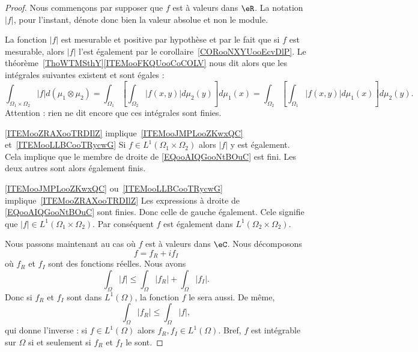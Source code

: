\begin{proof}

    Nous commençons par supposer que \( f\) est à valeurs dans \( \eR\). La notation \( | f |\), pour l'instant,  dénote donc bien la valeur absolue et non le module.

    La fonction \( | f |\) est mesurable et positive par hypothèse et par le fait que si \( f\) est mesurable, alors \( | f |\) l'est également par le corollaire~\ref{CORooNXYUooEcvDlP}. Le théorème~\ref{ThoWTMSthY}\ref{ITEMooFKQUooCoCOLV} nous dit alors que les intégrales suivantes existent et sont égales :
    \begin{equation}        \label{EQooAIQGooNtBOuC}
            \int_{\Omega_1\times \Omega_2}| f |d(\mu_1\otimes \mu_2)=\int_{\Omega_1}\left[ \int_{\Omega_2}|f(x,y)|d\mu_2(y) \right]d\mu_1(x)
            =\int_{\Omega_2}\left[ \int_{\Omega_1}|f(x,y)|d\mu_1(x) \right]d\mu_2(y).
    \end{equation}
    Attention : rien ne dit encore que ces intégrales sont finies.

    \begin{subproof}
        \item[\ref{ITEMooZRAXooTRDIlZ} implique~\ref{ITEMooJMPLooZKwxQC} et~\ref{ITEMooLLBCooTRycwG}]
            Si \( f\in L^1(\Omega_1\times \Omega_2)\) alors \( | f |\) y est également. Cela implique que le membre de droite de \eqref{EQooAIQGooNtBOuC} est fini. Les deux autres sont alors également finis.
        \item[\ref{ITEMooJMPLooZKwxQC} ou~\ref{ITEMooLLBCooTRycwG} implique~\ref{ITEMooZRAXooTRDIlZ}]
            Les expressions à droite de \eqref{EQooAIQGooNtBOuC} sont finies. Donc celle de gauche également. Cele signifie que \( | f |\in L^1(\Omega_1\times \Omega_2)\). Par conséquent \( f\) est également dans \(L^1(\Omega_2\times \Omega_2) \).
    \end{subproof}

    Nous passons maintenant au cas où \( f\) est à valeurs dans \( \eC\). Nous décomposons
    \begin{equation}
        f=f_R+if_I
    \end{equation}
    où \( f_R\) et \( f_I\) sont des fonctions réelles. Nous avons
    \begin{equation}        \label{EQooZEOAooIMwKwk}
        \int_{\Omega}| f |\leq \int_{\Omega}| f_R |+\int_{\Omega}| f_I |.
    \end{equation}
    Donc si \( f_R\) et \( f_I\) sont dans \( L^1(\Omega)\), la fonction \( f\) le sera aussi. De même,
    \begin{equation}
        \int_{\Omega}| f_R |\leq \int_{\Omega}| f |,
    \end{equation}
    qui donne l'inverse : si \( f\in L^1(\Omega)\) alors \( f_R,f_I\in L^1(\Omega)\). Bref, \( f\) est intégrable sur \( \Omega\) si et seulement si \( f_R\) et \( f_I\) le sont.


\end{proof}
